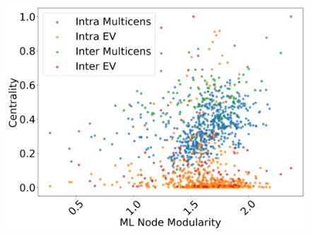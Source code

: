 \documentclass[10pt,letterpaper]{article}
\begin{document}
\begin{figure}[h!]
\begin{minipage}[b]{0.25\linewidth}
		\centering
		\includegraphics[width=\textwidth]{figs/fig3.png}
		\subcaption{}
	\end{minipage}
	
	\vspace{0.5cm}
	

\end{figure}
\end{document}
